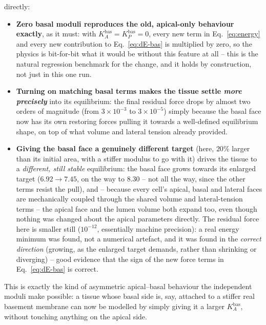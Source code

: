 \documentclass[11pt,a4paper]{report}
\begin{document}
directly:
\begin{itemize}[leftmargin=1.4em]
  \item \textbf{Zero basal moduli reproduces the old, apical-only
  behaviour exactly}, as it must: with $K_A^{\mathrm{bas}}=K_P^{\mathrm{bas}}=0$,
  every new term in Eq.~\ref{eq:energy} and every new contribution to
  Eq.~\ref{eq:dE-bas} is multiplied by zero, so the physics is
  bit-for-bit what it would be without this feature at all -- this is
  the natural regression benchmark for the change, and it holds by
  construction, not just in this one run.
  \item \textbf{Turning on matching basal terms makes the tissue settle
  \emph{more precisely}} into its equilibrium: the final residual
  force drops by almost two orders of magnitude (from $3\times10^{-3}$
  to $3\times10^{-5}$) simply because the basal face now has its own
  restoring forces pulling it towards a well-defined equilibrium shape,
  on top of what volume and lateral tension already provided.
  \item \textbf{Giving the basal face a genuinely different target}
  (here, $20\%$ larger than its initial area, with a stiffer modulus
  to go with it) drives the tissue to a \emph{different, still stable}
  equilibrium: the basal face grows towards its enlarged target ($6.92
  \to 7.45$, on the way to $8.30$ -- not all the way, since the other
  terms resist the pull), and -- because every cell's apical, basal and
  lateral faces are mechanically coupled through the shared volume and
  lateral-tension terms -- the apical face and the lumen volume both
  expand too, even though nothing was changed about the apical
  parameters directly. The residual force here is smaller still
  ($10^{-12}$, essentially machine precision): a real energy minimum
  was found, not a numerical artefact, and it was found in the
  \emph{correct direction} (growing, as the enlarged target demands,
  rather than shrinking or diverging) -- good evidence that the sign
  of the new force terms in Eq.~\ref{eq:dE-bas} is correct.
\end{itemize}
This is exactly the kind of asymmetric apical--basal behaviour the
independent moduli make possible: a tissue whose basal side is, say,
attached to a stiffer real basement membrane can now be modelled by
simply giving it a larger $K_A^{\mathrm{bas}}$, without touching
anything on the apical side.
\end{document}
